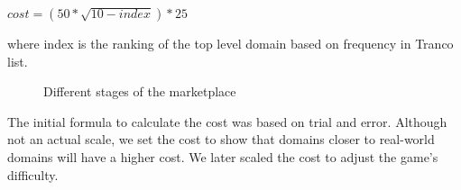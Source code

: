\begin{center}
    \begin{math}
        cost = (50 * \sqrt{10-index}) *25
    \end{math}
\end{center}

where index is the ranking of the top level domain based on frequency in Tranco list.

\begin{figure}[ht]
    \centering

    \hfill
    \hfill

    \label{fig:marketplace-state}
    \caption{Different stages of the marketplace}
\end{figure}

The initial formula to calculate the cost was based on trial and error. Although not an actual scale, we set the cost to show that domains closer to real-world domains will have a higher cost. We later scaled the cost to adjust the game's difficulty.

